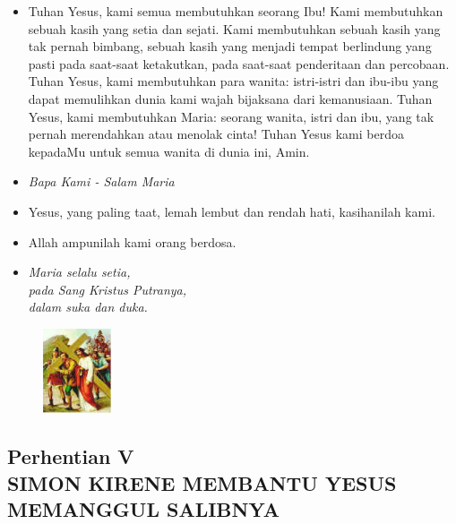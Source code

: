 \documentclass[a5paper,headsepline,titlepage,10pt,nnormalheadings,DIVcalc]{scrbook}
\newcommand{\BU}[1]{\begin{itemize} \item[U:] #1 \end{itemize}}
\newcommand{\BP}[1]{\begin{itemize} \item[P:] #1 \end{itemize}}
\newcommand{\kasihanilahKami}{\BP{Yesus, yang paling taat, lemah lembut dan rendah hati, kasihanilah kami.}
\BU{Allah ampunilah kami orang berdosa.}}
\begin{document}
\BU{Tuhan Yesus, kami semua membutuhkan seorang Ibu! Kami membutuhkan sebuah kasih yang setia dan sejati. Kami membutuhkan sebuah kasih yang tak pernah bimbang, sebuah kasih yang menjadi tempat berlindung yang pasti pada saat-saat ketakutkan, pada saat-saat penderitaan dan percobaan. Tuhan Yesus, kami membutuhkan para wanita: istri-istri dan ibu-ibu yang dapat memulihkan dunia kami wajah bijaksana dari kemanusiaan. Tuhan Yesus, kami membutuhkan Maria: seorang wanita, istri dan ibu, yang tak pernah merendahkan atau menolak cinta! Tuhan Yesus kami berdoa kepadaMu untuk semua wanita di dunia ini, Amin.}

\large\begin{itemize}\item[~]\it{Bapa Kami - Salam Maria}\end{itemize}\normalsize
\kasihanilahKami

\begin{itemize}
\item[5.] \it{Maria selalu setia,\\ 
	pada Sang Kristus Putranya,\\ 
	dalam suka dan duka.}
\end{itemize}

\begin{figure}
\includegraphics[width=2cm]{jalansalib_files/05_small.jpg}
\end{figure}
\subsection*{Perhentian V\\
SIMON KIRENE MEMBANTU YESUS\\MEMANGGUL SALIBNYA}
\end{document}
